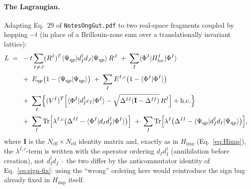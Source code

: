 \documentclass[11pt]{article}
\newcommand{\Neff}{N_{\mathrm{eff}}}
\newcommand{\Himp}{H_{\mathrm{imp}}}
\newcommand{\Hloc}{H_{\mathrm{loc}}}
\begin{document}
\paragraph{The Lagrangian.} Adapting Eq.~29 of \texttt{NotesOngGut.pdf} to
two real-space fragments coupled by hopping $-t$ (in place of a
Brillouin-zone sum over a translationally invariant lattice):
\begin{align}
  L \;=\;\;& -t\sum_{I\neq J}(R^I)^{T}\langle\Psi_{\mathrm{qp}}|d^{\dagger}_{I}d_{J}|\Psi_{\mathrm{qp}}\rangle\,R^{J}
     \;+\; \sum_{I}\langle\Phi^I|\Hloc^{I}|\Phi^I\rangle
     \notag\\[2pt]
   & +\; E_{\mathrm{qp}}\bigl(1-\langle\Psi_{\mathrm{qp}}|\Psi_{\mathrm{qp}}\rangle\bigr)
     \;+\; \sum_{I}E^{I,c}\bigl(1-\langle\Phi^I|\Phi^I\rangle\bigr)
     \notag\\[2pt]
   & +\; \sum_{I}\Bigl\{(V^I)^{T}\Bigl[\langle\Phi^I|d^{\dagger}_{I}c_{I}|\Phi^I\rangle
       -\sqrt{\Delta^{II}(\mathbf{I}-\Delta^{II})}\,R^{I}\Bigr] + \mathrm{h.c.}\Bigr\}
     \notag\\[2pt]
   & +\; \sum_{I}\mathrm{Tr}\Bigl[\lambda^{I,c}\bigl(\Delta^{II}-\langle\Phi^I|d_{I}d^{\dagger}_{I}|\Phi^I\rangle\bigr)\Bigr]
     \;+\; \sum_{I}\mathrm{Tr}\Bigl[\lambda^{I}\bigl(\Delta^{II}-\langle\Psi_{\mathrm{qp}}|d^{\dagger}_{I}d_{I}|\Psi_{\mathrm{qp}}\rangle\bigr)\Bigr],
  \label{eq:lagrangian}
\end{align}
where $\mathbf{I}$ is the $\Neff\times\Neff$ identity matrix and, exactly as
in $\Himp$ (Eq.~\eqref{eq:Himp}), the $\lambda^{I,c}$-term is written with
the operator ordering $d_{I}d^{\dagger}_{I}$ (annihilation before creation),
not $d^{\dagger}_{I}d_{I}$ -- the two differ by the anticommutator identity
of Eq.~\eqref{eq:sign-fix}: using the ``wrong'' ordering here would
reintroduce the sign bug already fixed in $\Himp$ itself.
\end{document}
